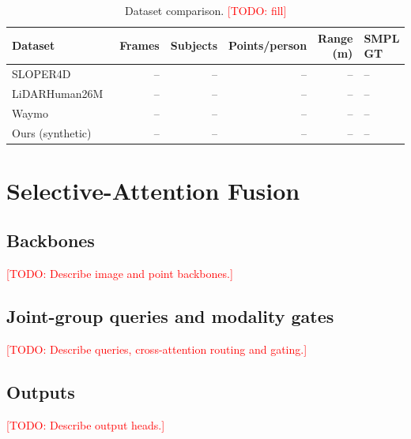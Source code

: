 \documentclass{egpubl}
\newcommand{\todo}[1]{\textcolor{red}{[TODO: #1]}}
\begin{document}
\begin{table}[t]
  \centering
  \caption{Dataset comparison. \todo{fill}}
  \label{tab:dataset_stats}
  \begin{tabular}{@{}lrrrrl@{}}
    \toprule
    Dataset & Frames & Subjects & Points/person & Range (m) & SMPL GT \\
    \midrule
    SLOPER4D~\cite{dai2023sloper4d}  & -- & -- & -- & -- & -- \\
    LiDARHuman26M~\cite{li2022lidarcap} & -- & -- & -- & -- & -- \\
    Waymo~\cite{sun2020waymo}        & -- & -- & -- & -- & -- \\
    Ours (synthetic)                  & -- & -- & -- & -- & -- \\
    \bottomrule
  \end{tabular}
\end{table}

\section{Selective-Attention Fusion}
\label{sec:method}

\subsection{Backbones}
\todo{Describe image and point backbones.}

\subsection{Joint-group queries and modality gates}
\todo{Describe queries, cross-attention routing and gating.}

\subsection{Outputs}
\todo{Describe output heads.}
\end{document}
